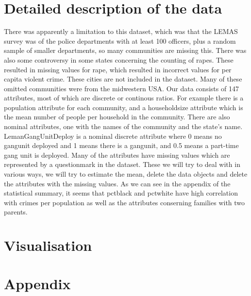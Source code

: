 \documentclass[a4paper,10pt]{article}
\begin{document}
\section{Detailed description of the data}
There was apparently a limitation to this dataset, which was that the LEMAS survey was of the police departments with at least 100 officers, plus a random sample of smaller departments, so many communities are missing this. There was also some controversy in some states concerning the counting of rapes. These resulted in missing values for rape, which resulted in incorrect values for per capita violent crime. These cities are not included in the dataset. Many of these omitted communities were from the midwestern USA. 
Our data consists of 147 attributes, most of which are discrete or continous ratios. For example there is a population attribute for each community, and a householdsize attribute which is the mean number of people per household in the community. There are also nominal attributes, one with the names of the community and the state's name. LemanGangUnitDeploy is a nominal discrete attribute where 0 means no gangunit deployed and 1 means there is a gangunit, and 0.5 means a part-time gang unit is deployed. 
Many of the attributes have missing values which are represented by a questionmark in the dataset. These we will try to deal with in various ways, we will try to estimate the mean, delete the data objects and delete the attributes with the missing values.
As we can see in the appendix of the statistical summary, it seems that pctblack and pctwhite have high correlation with crimes per population as well as the attributes conserning families with two parents.

\section{Visualisation}


\section{Appendix}
\end{document}
